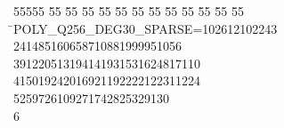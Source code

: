 %
%
\begin{tabbing}
55555 \= 55 \= 55 \= 55 \= 55 \= 55 \= 55 \= 55 \= 55 \= 55 \= 55 \= 55 \= 55 \= \>POLY\_Q256\_DEG30\_SPARSE=102612102243\\[0pt]
241485160658710881999951056\\[0pt]
391220513194141931531624817110\\[0pt]
415019242016921192222122311224\\[0pt]
5259726109271742825329130\\[0pt]
6\>\end{tabbing}
